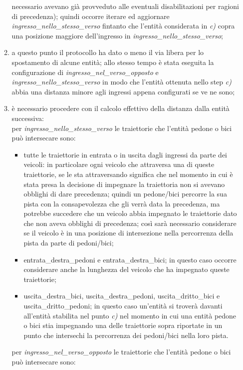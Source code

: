 \begin{enumerate}
\begin{enumerate}
necessario avevano già provveduto alle eventuali disabilitazioni per ragioni di precedenza); quindi occorre iterare ed aggiornare \textit{ingres\-so\_nel\-lo\_stes\-so\_ver\-so} fintanto che l'entità considerata in \textit{c)} copra una posizione maggiore dell'ingresso in \textit{ingres\-so\_nel\-lo\_stes\-so\_ver\-so};
\item a questo punto il protocollo ha dato o meno il via libera per lo spostamento di alcune entità; allo stesso tempo è stata eseguita la configurazione di \textit{ingres\-so\_nel\_ver\-so\_op\-pos\-to} e \textit{ingres\-so\_nel\-lo\_stes\-so\_ver\-so} in modo che l'entità ottenuta nello step \textit{c)} abbia una distanza minore agli ingressi appena configurati se ve ne sono;
\item è necessario procedere con il calcolo effettivo della distanza dalla entità successiva:\\
per \textit{ingres\-so\_nel\-lo\_stes\-so\_ver\-so} le traiettorie che l'entità pedone o bici può intersecare sono:
\begin{itemize}
\item tutte le traiettorie in entrata o in uscita dagli ingressi da parte dei veicoli: in particolare ogni veicolo che attraversa una di queste traiettorie, se le sta attraversando significa che nel momento in cui è stata presa la decisione di impegnare la traiettoria non si avevano obblighi di dare precedenza; quindi un pedone/bici percorre la sua pista con la consapevolezza che gli verrà data la precedenza, ma potrebbe succedere che un veicolo abbia impegnato le traiettorie dato che non aveva obblighi di precedenza; così sarà necessario considerare se il veicolo è in una posizione di intersezione nella percorrenza della pista da parte di pedoni/bici; 
\item en\-tra\-ta\_des\-tra\_pe\-do\-ni e en\-tra\-ta\_des\-tra\_bi\-ci; in questo caso occorre considerare anche la lunghezza del veicolo che ha impegnato queste traiettorie;
\item usci\-ta\_des\-tra\_bi\-ci, usci\-ta\_des\-tra\_pe\-do\-ni, usci\-ta\_drit\-to\_bi\-ci e usci\-ta\_drit\-to\_pe\-do\-ni; in questo caso un'entità si troverà davanti all'entità stabilita nel punto \textit{c)} nel momento in cui una entità pedone o bici stia impegnando una delle traiettorie sopra riportate in un punto che intersechi la percorrenza dei pedoni/bici nella loro pista.
\end{itemize}
per \textit{ingres\-so\_nel\_ver\-so\_op\-pos\-to} le traiettorie che l'entità pedone o bici può intersecare sono:

\end{enumerate}
\end{enumerate}
